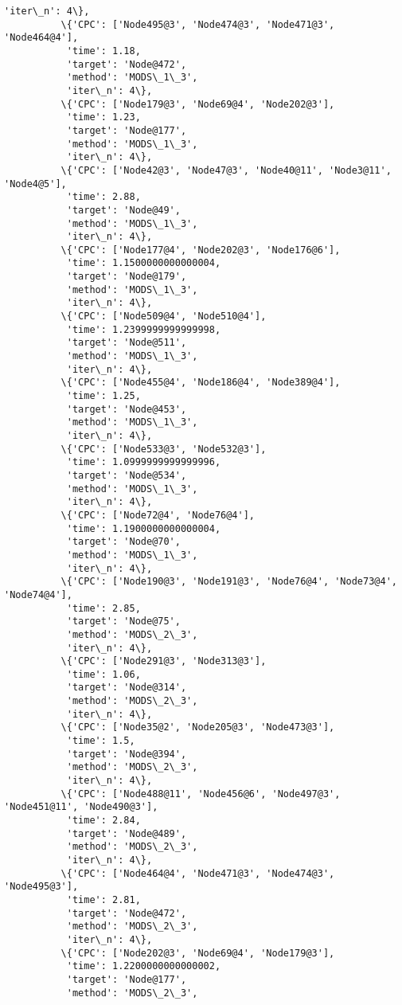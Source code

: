 \documentclass[11pt]{article}
\begin{document}
\begin{Verbatim}[commandchars=\\\{\}]
           'iter\_n': 4\},
          \{'CPC': ['Node495@3', 'Node474@3', 'Node471@3', 'Node464@4'],
           'time': 1.18,
           'target': 'Node@472',
           'method': 'MODS\_1\_3',
           'iter\_n': 4\},
          \{'CPC': ['Node179@3', 'Node69@4', 'Node202@3'],
           'time': 1.23,
           'target': 'Node@177',
           'method': 'MODS\_1\_3',
           'iter\_n': 4\},
          \{'CPC': ['Node42@3', 'Node47@3', 'Node40@11', 'Node3@11', 'Node4@5'],
           'time': 2.88,
           'target': 'Node@49',
           'method': 'MODS\_1\_3',
           'iter\_n': 4\},
          \{'CPC': ['Node177@4', 'Node202@3', 'Node176@6'],
           'time': 1.1500000000000004,
           'target': 'Node@179',
           'method': 'MODS\_1\_3',
           'iter\_n': 4\},
          \{'CPC': ['Node509@4', 'Node510@4'],
           'time': 1.2399999999999998,
           'target': 'Node@511',
           'method': 'MODS\_1\_3',
           'iter\_n': 4\},
          \{'CPC': ['Node455@4', 'Node186@4', 'Node389@4'],
           'time': 1.25,
           'target': 'Node@453',
           'method': 'MODS\_1\_3',
           'iter\_n': 4\},
          \{'CPC': ['Node533@3', 'Node532@3'],
           'time': 1.0999999999999996,
           'target': 'Node@534',
           'method': 'MODS\_1\_3',
           'iter\_n': 4\},
          \{'CPC': ['Node72@4', 'Node76@4'],
           'time': 1.1900000000000004,
           'target': 'Node@70',
           'method': 'MODS\_1\_3',
           'iter\_n': 4\},
          \{'CPC': ['Node190@3', 'Node191@3', 'Node76@4', 'Node73@4', 'Node74@4'],
           'time': 2.85,
           'target': 'Node@75',
           'method': 'MODS\_2\_3',
           'iter\_n': 4\},
          \{'CPC': ['Node291@3', 'Node313@3'],
           'time': 1.06,
           'target': 'Node@314',
           'method': 'MODS\_2\_3',
           'iter\_n': 4\},
          \{'CPC': ['Node35@2', 'Node205@3', 'Node473@3'],
           'time': 1.5,
           'target': 'Node@394',
           'method': 'MODS\_2\_3',
           'iter\_n': 4\},
          \{'CPC': ['Node488@11', 'Node456@6', 'Node497@3', 'Node451@11', 'Node490@3'],
           'time': 2.84,
           'target': 'Node@489',
           'method': 'MODS\_2\_3',
           'iter\_n': 4\},
          \{'CPC': ['Node464@4', 'Node471@3', 'Node474@3', 'Node495@3'],
           'time': 2.81,
           'target': 'Node@472',
           'method': 'MODS\_2\_3',
           'iter\_n': 4\},
          \{'CPC': ['Node202@3', 'Node69@4', 'Node179@3'],
           'time': 1.2200000000000002,
           'target': 'Node@177',
           'method': 'MODS\_2\_3',

\end{Verbatim}
\end{document}
